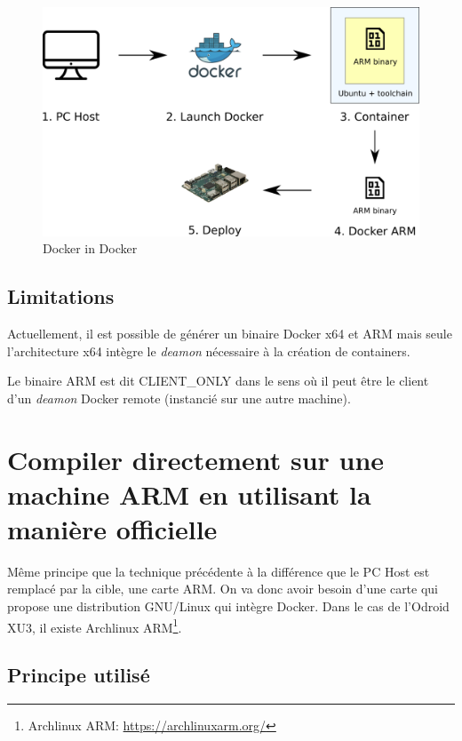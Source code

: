 \documentclass[11pt,a4paper,oneside]{report}
\begin{document}
\begin{figure}
    \begin{center}
        \includegraphics[scale=0.6]{img/docker_in_docker}
    \end{center}
    \caption{Docker in Docker}
    \label{fig_docker_in_docker}
\end{figure}

\subsection{Limitations}\label{maniere_officielle_limitations}

Actuellement, il est possible de générer un binaire Docker x64 et ARM mais seule l'architecture x64 intègre le \emph{deamon} nécessaire à la création de containers.

Le binaire ARM est dit CLIENT\_ONLY dans le sens où il peut être le client d'un \emph{deamon} Docker remote (instancié sur une autre machine).


\section{Compiler directement sur une machine ARM en utilisant la manière officielle}

Même principe que la technique précédente à la différence que le PC Host est remplacé par la cible, une carte ARM. On va donc avoir besoin d'une carte qui propose une distribution GNU/Linux qui intègre Docker. Dans le cas de l'Odroid XU3, il existe Archlinux ARM\footnote{Archlinux ARM: \url{https://archlinuxarm.org/}}.

\subsection{Principe utilisé}
\end{document}
